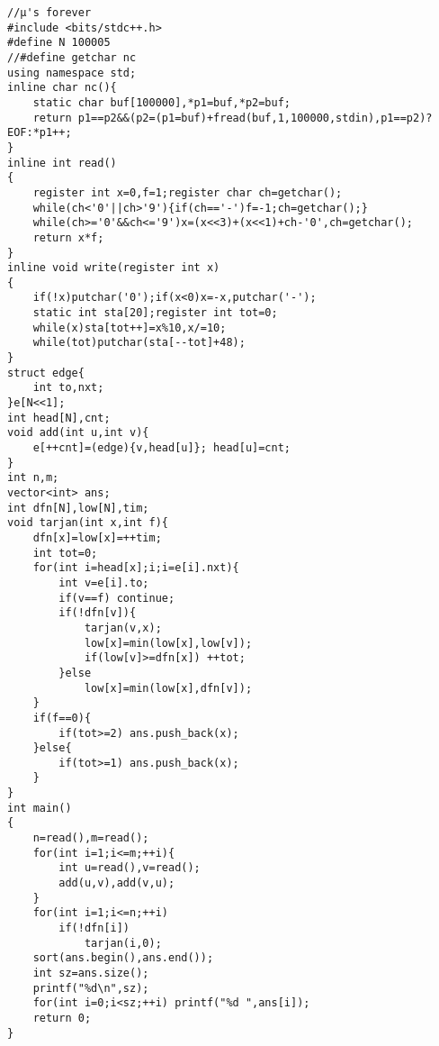 \begin{verbatim}
//μ's forever
#include <bits/stdc++.h>
#define N 100005
//#define getchar nc
using namespace std;
inline char nc(){
    static char buf[100000],*p1=buf,*p2=buf;
    return p1==p2&&(p2=(p1=buf)+fread(buf,1,100000,stdin),p1==p2)?EOF:*p1++;
}
inline int read()
{
    register int x=0,f=1;register char ch=getchar();
    while(ch<'0'||ch>'9'){if(ch=='-')f=-1;ch=getchar();}
    while(ch>='0'&&ch<='9')x=(x<<3)+(x<<1)+ch-'0',ch=getchar();
    return x*f;
}
inline void write(register int x)
{
    if(!x)putchar('0');if(x<0)x=-x,putchar('-');
    static int sta[20];register int tot=0;
    while(x)sta[tot++]=x%10,x/=10;
    while(tot)putchar(sta[--tot]+48);
}
struct edge{
    int to,nxt;
}e[N<<1];
int head[N],cnt;
void add(int u,int v){
    e[++cnt]=(edge){v,head[u]}; head[u]=cnt;
}
int n,m;
vector<int> ans;
int dfn[N],low[N],tim;
void tarjan(int x,int f){
    dfn[x]=low[x]=++tim;
    int tot=0;
    for(int i=head[x];i;i=e[i].nxt){
        int v=e[i].to;
        if(v==f) continue;
        if(!dfn[v]){
            tarjan(v,x);
            low[x]=min(low[x],low[v]);
            if(low[v]>=dfn[x]) ++tot;
        }else   
            low[x]=min(low[x],dfn[v]);
    }
    if(f==0){
        if(tot>=2) ans.push_back(x);
    }else{
        if(tot>=1) ans.push_back(x);
    }
}
int main()
{
    n=read(),m=read();
    for(int i=1;i<=m;++i){
        int u=read(),v=read();
        add(u,v),add(v,u);
    }
    for(int i=1;i<=n;++i)
        if(!dfn[i])
            tarjan(i,0);
    sort(ans.begin(),ans.end());
    int sz=ans.size();
    printf("%d\n",sz);
    for(int i=0;i<sz;++i) printf("%d ",ans[i]);
    return 0;
}
\end{verbatim}
